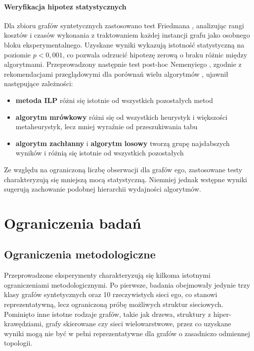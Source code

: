\paragraph{Weryfikacja hipotez statystycznych}

Dla zbioru grafów syntetycznych zastosowano test Friedmana \cite{friedman1937}, analizując rangi kosztów i czasów wykonania z traktowaniem każdej instancji grafu jako osobnego bloku eksperymentalnego. Uzyskane wyniki wykazują istotność statystyczną na poziomie $p < 0{,}001$, co pozwala odrzucić hipotezę zerową o braku różnic między algorytmami. Przeprowadzony następnie test post-hoc Nemenyiego \cite{nemenyi1963}, zgodnie z rekomendacjami przeglądowymi dla porównań wielu algorytmów \cite{demsar2006}, ujawnił następujące zależności:

\begin{itemize}
  \item \textbf{metoda ILP} różni się istotnie od wszystkich pozostałych metod
  \item \textbf{algorytm mrówkowy} różni się od wszystkich heurystyk i większości metaheurystyk, lecz mniej wyraźnie od przeszukiwania tabu
  \item \textbf{algorytm zachłanny} i \textbf{algorytm losowy} tworzą grupę najsłabszych wyników i różnią się istotnie od wszystkich pozostałych
\end{itemize}

Ze względu na ograniczoną liczbę obserwacji dla grafów ego, zastosowane testy charakteryzują się mniejszą mocą statystyczną. Niemniej jednak wstępne wyniki sugerują zachowanie podobnej hierarchii wydajności algorytmów.

\section{Ograniczenia badań}

\subsection{Ograniczenia metodologiczne}

Przeprowadzone eksperymenty charakteryzują się kilkoma istotnymi ograniczeniami metodologicznymi. Po pierwsze, badania obejmowały jedynie trzy klasy grafów syntetycznych oraz 10 rzeczywistych sieci ego, co stanowi reprezentatywną, lecz ograniczoną próbę możliwych struktur sieciowych. Pominięto inne istotne rodzaje grafów, takie jak drzewa, struktury z hiper-krawędziami, grafy skierowane czy sieci wielowarstwowe, przez co uzyskane wyniki mogą nie być w pełni reprezentatywne dla grafów o zasadniczo odmiennej topologii.

